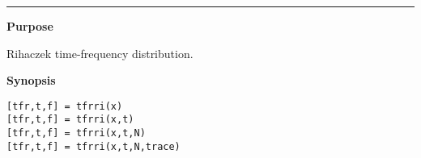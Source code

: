 

\hspace*{-1.6cm}{\Large \bf tfrri}

\vspace*{-.4cm}
\hspace*{-1.6cm}\rule[0in]{16.5cm}{.02cm}
\vspace*{.2cm}

{\bf \large {}\selectfont Purpose}\\
\hspace*{1.5cm}
\begin{minipage}[t]{13.5cm}
Rihaczek time-frequency distribution.
\end{minipage}
\vspace*{.3cm}

{\bf \large {}\selectfont Synopsis}\\
\hspace*{1.5cm}
\begin{minipage}[t]{13.5cm}
\begin{verbatim}
[tfr,t,f] = tfrri(x)
[tfr,t,f] = tfrri(x,t)
[tfr,t,f] = tfrri(x,t,N)
[tfr,t,f] = tfrri(x,t,N,trace)
\end{verbatim}
\end{minipage}
\vspace*{.5cm}


